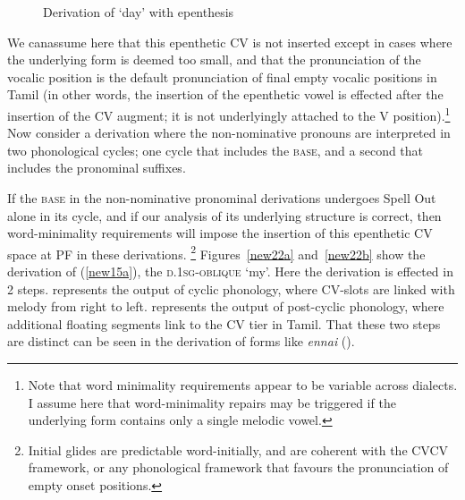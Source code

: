 \documentclass[output=paper]{langscibook}
\begin{document}
\begin{figure}
\begin{minipage}{.25\textwidth}
    \end{minipage}
    \caption{Derivation of `day' with epenthesis}
    \label{new21}
\end{figure}

We can\largerpage[2] assume here that this epenthetic CV is not inserted except in cases where the underlying form is deemed too small, and that the pronunciation of the vocalic position is the default pronunciation of final empty vocalic positions in Tamil (in other words, the insertion of the epenthetic vowel is effected after the insertion of the CV augment; it is not underlyingly attached to the V position).\footnote{Note that word minimality requirements appear to be variable across dialects. I assume here that word-minimality repairs may be triggered if the underlying form contains only a single melodic vowel.}  Now consider a derivation where the non-nominative pronouns are interpreted in two phonological cycles; one cycle that includes the \textsc{base}, and a second that includes the pronominal suffixes. 

If the \textsc{base} in the non-nominative pronominal derivations undergoes Spell Out alone in its cycle, and if our analysis of its underlying structure is correct, then word-minimality requirements will impose the insertion of this epenthetic CV space at PF in these derivations.%
    \footnote{Initial glides are predictable word-initially, and are coherent with the CVCV framework, or any phonological framework that favours the pronunciation of empty onset positions.} 
Figures~\ref{new22a} and~\ref{new22b} show the derivation of (\ref{new15a}), the \textsc{d}.1\textsc{sg-oblique} ‘my’. Here the derivation is effected in 2 steps.  represents the output of cyclic phonology, where CV-slots are linked with melody from right to left.  represents the output of post-cyclic phonology, where additional floating segments link to the CV tier in Tamil. That these two steps are distinct can be seen in the derivation of forms like \textit{ennai} ().
\end{document}
